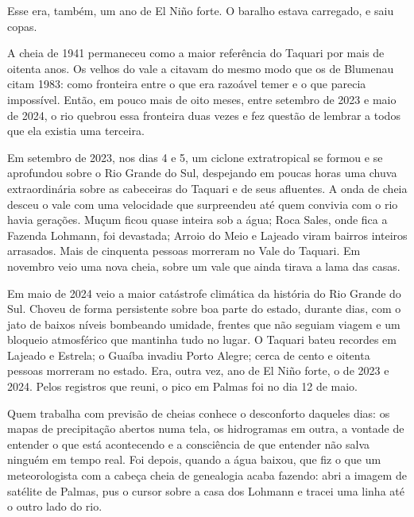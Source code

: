 \documentclass[
  brazilian,
  11pt,
  openany]{book}
\begin{document}
Esse era, também, um ano de El Niño forte. O baralho estava carregado, e
saiu copas.

A cheia de 1941 permaneceu como a maior referência do Taquari por mais
de oitenta anos. Os velhos do vale a citavam do mesmo modo que os de
Blumenau citam 1983: como fronteira entre o que era razoável temer e o
que parecia impossível. Então, em pouco mais de oito meses, entre
setembro de 2023 e maio de 2024, o rio quebrou essa fronteira duas vezes
e fez questão de lembrar a todos que ela existia uma terceira.

Em setembro de 2023, nos dias 4 e 5, um ciclone extratropical se formou
e se aprofundou sobre o Rio Grande do Sul, despejando em poucas horas
uma chuva extraordinária sobre as cabeceiras do Taquari e de seus
afluentes. A onda de cheia desceu o vale com uma velocidade que
surpreendeu até quem convivia com o rio havia gerações. Muçum ficou
quase inteira sob a água; Roca Sales, onde fica a Fazenda Lohmann, foi
devastada; Arroio do Meio e Lajeado viram bairros inteiros arrasados.
Mais de cinquenta pessoas morreram no Vale do Taquari. Em novembro veio
uma nova cheia, sobre um vale que ainda tirava a lama das casas.

Em maio de 2024 veio a maior catástrofe climática da história do Rio
Grande do Sul. Choveu de forma persistente sobre boa parte do estado,
durante dias, com o jato de baixos níveis bombeando umidade, frentes que
não seguiam viagem e um bloqueio atmosférico que mantinha tudo no lugar.
O Taquari bateu recordes em Lajeado e Estrela; o Guaíba invadiu Porto
Alegre; cerca de cento e oitenta pessoas morreram no estado. Era, outra
vez, ano de El Niño forte, o de 2023 e 2024. Pelos registros que reuni,
o pico em Palmas foi no dia 12 de maio.

Quem trabalha com previsão de cheias conhece o desconforto daqueles
dias: os mapas de precipitação abertos numa tela, os hidrogramas em
outra, a vontade de entender o que está acontecendo e a consciência de
que entender não salva ninguém em tempo real. Foi depois, quando a água
baixou, que fiz o que um meteorologista com a cabeça cheia de genealogia
acaba fazendo: abri a imagem de satélite de Palmas, pus o cursor sobre a
casa dos Lohmann e tracei uma linha até o outro lado do rio.
\end{document}
